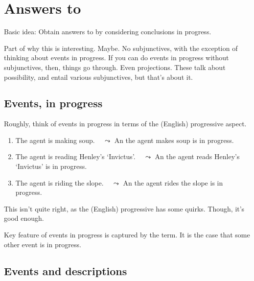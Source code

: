 \documentclass[10pt]{article}
\begin{document}
\section{Answers to \qWhy{}}
\label{sec:answers-qwhy}

\begin{note}
  Basic idea: Obtain answers to \qWhy{} by considering conclusions in progress.
\end{note}


\begin{note}
  Part of why this is interesting.
  Maybe.
  No subjunctives, with the exception of thinking about events in progress.
  If you can do events in progress without subjunctives, then, things go through.
  Even projections.
  These talk about possibility, and entail various subjunctives, but that's about it.
\end{note}


\subsection{Events, in progress}
\label{sec:events-progress}

\begin{note}
  Roughly, think of events in progress in terms of the (English) progressive aspect.
  \begin{enumerate}
  \item
    The agent is making soup.\newline
    \mbox{ } \hfill \(\leadsto\) An  the agent makes soup is in progress.
  \item
    The agent is reading Henley's `Invictus'.\newline
    \mbox{ } \hfill \(\leadsto\) An  the agent reads Henley's `Invictus' is in progress.
  \item
    The agent is riding the slope.\newline
    \mbox{ } \hfill \(\leadsto\) An  the agent rides the slope is in progress.
  \end{enumerate}
  This isn't quite right, as the (English) progressive has some quirks.
  Though, it's good enough.
\end{note}

\begin{note}
  Key feature of events in progress is captured by the term.
  It is the case that some other event is in progress.
\end{note}

\subsection{Events and descriptions}
\label{sec:events-descriptions}
\end{document}
